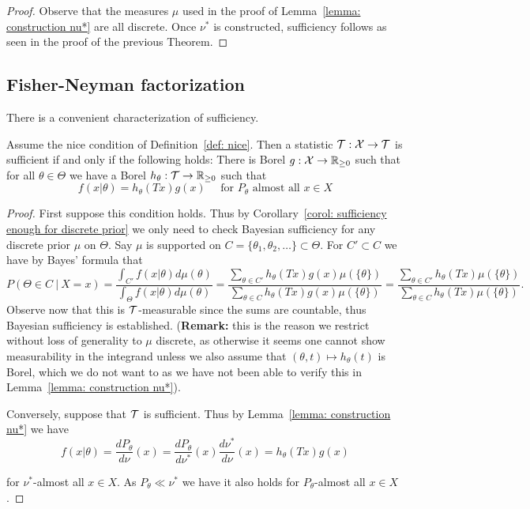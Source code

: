 \documentclass[twoside, a4paper, 10pt]{amsart}
\begin{document}
\begin{proof} Observe that the measures $\mu$ used in the proof of Lemma~\ref{lemma: construction nu*} are all discrete. Once $\nu^*$ is constructed, sufficiency follows as seen in the proof of the previous Theorem. \end{proof}


\subsection{Fisher-Neyman factorization}

There is a convenient characterization of sufficiency.

\begin{thm} Assume the nice condition of Definition~\ref{def: nice}. Then a statistic $\mathcal{T}:\mathcal{X} \to \mathcal{T}$ is sufficient if and only if the following holds: There is Borel $g:\mathcal{X} \to \mathbb{R}_{\geq 0}$ such that for all $\theta \in \Theta$ we have a Borel $h_{\theta}:\mathcal{T} \to \mathbb{R}_{\geq 0}$ such that $$f(x|\theta) = h_{\theta}(Tx) g(x) \quad\text{ for $P_{\theta}$ almost all $x \in X$} $$

\end{thm}

\begin{proof} First suppose this condition holds. Thus by Corollary~\ref{corol: sufficiency enough for discrete prior} we only need to check Bayesian sufficiency for any discrete prior $\mu$ on $\Theta$. Say $\mu$ is supported on $C = \{\theta_1, \theta_2,\ldots \} \subset \Theta$. For $C' \subset C$ we have by Bayes' formula that $$P(\Theta \in C ~|~ X=x) = \frac{\int_{C'} f(x|\theta) d\mu(\theta) }{\int_{\Theta} f(x|\theta) d\mu(\theta) }  = \frac{\sum_{\theta \in C'} h_{\theta}(Tx)g(x) \mu(\{\theta\})}{\sum_{\theta \in C} h_{\theta}(Tx)g(x) \mu(\{\theta\})} = \frac{\sum_{\theta \in C'} h_{\theta}(Tx) \mu(\{\theta\})}{\sum_{\theta \in C} h_{\theta}(Tx) \mu(\{\theta\})}. $$ Observe now that this is $\mathcal{T}$-measurable since the sums are countable, thus Bayesian sufficiency is established. (\textbf{Remark:} this is the reason we restrict without loss of generality to $\mu$ discrete, as otherwise it seems one cannot show measurability in the integrand unless we also assume that $(\theta, t) \mapsto h_{\theta}(t)$ is Borel, which we do not want to as we have not been able to verify this in Lemma~\ref{lemma: construction nu*}).

Conversely, suppose that $\mathcal{T}$ is sufficient. Thus by Lemma~\ref{lemma: construction nu*} we have $$f(x|\theta) = \frac{dP_{\theta}}{d\nu}(x) = \frac{dP_{\theta}}{d\nu^*}(x) \frac{d\nu^*}{d\nu}(x) = h_{\theta}(Tx) g(x)$$

for $\nu^*$-almost all $x \in X$. As $P_{\theta} \ll \nu^*$ we have it also holds for $P_{\theta}$-almost all $x \in X$. \end{proof}
\end{document}

